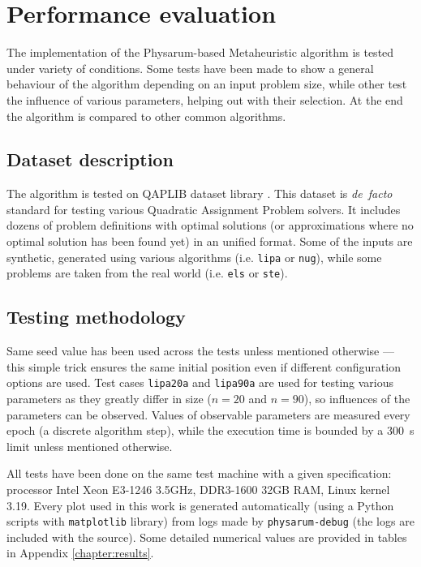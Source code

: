 \section{Performance evaluation}
\label{section:project_evaluation}

The implementation of the Physarum-based Metaheuristic algorithm is tested under variety of conditions. Some tests have been made to show a general behaviour of the algorithm depending on an input problem size, while other test the influence of various parameters, helping out with their selection. At the end the algorithm is compared to other common algorithms.


\subsection{Dataset description}

The algorithm is tested on QAPLIB dataset library \cite{burkard1997qaplib}. This dataset is \textit{de~facto} standard for testing various Quadratic Assignment Problem solvers. It includes dozens of problem definitions with optimal solutions (or approximations where no optimal solution has been found yet) in an unified format. Some of the inputs are synthetic, generated using various algorithms (i.e. \texttt{lipa} or \texttt{nug}), while some problems are taken from the real world (i.e. \texttt{els} or \texttt{ste}).


\subsection{Testing methodology}

Same seed value has been used across the tests unless mentioned otherwise --- this simple trick ensures the same initial position even if different configuration options are used. Test cases \texttt{lipa20a} and \texttt{lipa90a} are used for testing various parameters as they greatly differ in size ($n=20$ and $n=90$), so influences of the parameters can be observed. Values of observable parameters are measured every epoch (a discrete algorithm step), while the execution time is bounded by a 300~s limit unless mentioned otherwise.

All tests have been done on the same test machine with a given specification: processor Intel Xeon E3-1246 3.5GHz, DDR3-1600 32GB RAM, Linux kernel 3.19. Every plot used in this work is generated automatically (using a Python scripts with \texttt{matplotlib} library) from logs made by \texttt{physarum-debug} (the logs are included with the source). Some detailed numerical values are provided in tables in Appendix \ref{chapter:results}.


